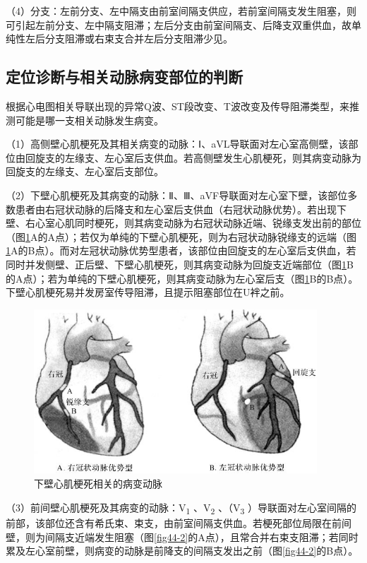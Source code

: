 （4）分支：左前分支、左中隔支由前室间隔支供应，若前室间隔支发生阻塞，则可引起左前分支、左中隔支阻滞；左后分支由前室间隔支、后降支双重供血，故单纯性左后分支阻滞或右束支合并左后分支阻滞少见。

\protect\hypertarget{text00052.htmlux5cux23subid623}{}{}

\subsection{定位诊断与相关动脉病变部位的判断}

根据心电图相关导联出现的异常Q波、ST段改变、T波改变及传导阻滞类型，来推测可能是哪一支相关动脉发生病变。

（1）高侧壁心肌梗死及其相关病变的动脉：Ⅰ、aVL导联面对左心室高侧壁，该部位由回旋支的左缘支、左心室后支供血。若高侧壁发生心肌梗死，则其病变动脉为回旋支的左缘支、左心室后支部位。

（2）下壁心肌梗死及其病变的动脉：Ⅱ、Ⅲ、aVF导联面对左心室下壁，该部位多数患者由右冠状动脉的后降支和左心室后支供血（右冠状动脉优势）。若出现下壁、右心室心肌同时梗死，则其病变动脉为右冠状动脉近端、锐缘支发出前的部位（图\ref{fig44-1}A的A点）；若仅为单纯的下壁心肌梗死，则为右冠状动脉锐缘支的远端（图\ref{fig44-1}A的B点）。而对左冠状动脉优势型患者，该部位由回旋支的左心室后支供血，若同时并发侧壁、正后壁、下壁心肌梗死，则其病变动脉为回旋支近端部位（图\ref{fig44-1}B的A点）；若为单纯的下壁心肌梗死，则其病变动脉为左心室后支（图\ref{fig44-1}B的B点）。下壁心肌梗死易并发房室传导阻滞，且提示阻塞部位在U袢之前。

\begin{figure}[!htbp]
 \centering
 \includegraphics[width=4.17708in,height=2.42708in]{./images/Image00709.jpg}
 \captionsetup{justification=centering}
 \caption{下壁心肌梗死相关的病变动脉}
 \label{fig44-1}
  \end{figure} 

（3）前间壁心肌梗死及其病变的动脉：V\textsubscript{1}
、V\textsubscript{2} 、（V\textsubscript{3}
）导联面对左心室间隔的前部，该部位还含有希氏束、束支，由前室间隔支供血。若梗死部位局限在前间壁，则为间隔支近端发生阻塞（图\ref{fig44-2}的A点），且常合并右束支阻滞；若同时累及左心室前壁，则病变的动脉是前降支的间隔支发出之前（图\ref{fig44-2}的B点）。

